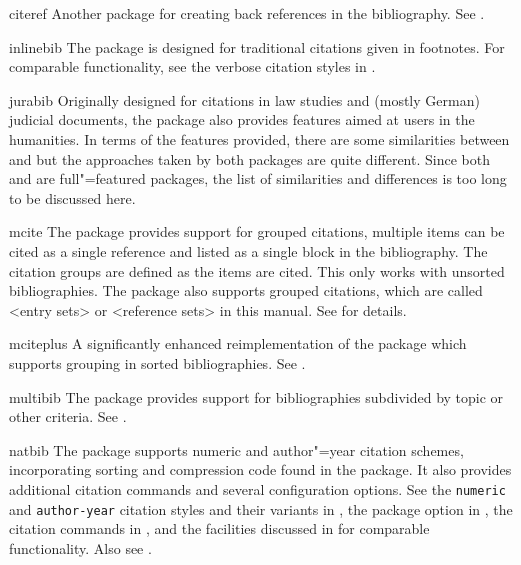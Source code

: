 \documentclass{ltxdockit}[2011/03/25]
\newcommand*{\biblatex}{\sty{biblatex}\xspace}
\begin{document}
\begin{marglist}
\item[citeref]
Another package for creating back references in the bibliography. See .

\item[inlinebib]
The  package is designed for traditional citations given in footnotes. For comparable functionality, see the verbose citation styles in .

\item[jurabib]
Originally designed for citations in law studies and (mostly German) judicial documents, the  package also provides features aimed at users in the humanities. In terms of the features provided, there are some similarities between  and \biblatex but the approaches taken by both packages are quite different. Since both  and \biblatex are full"=featured packages, the list of similarities and differences is too long to be discussed here.

\item[mcite]
The  package provides support for grouped citations, \ie multiple items can be cited as a single reference and listed as a single block in the bibliography. The citation groups are defined as the items are cited. This only works with unsorted bibliographies. The \biblatex package also supports grouped citations, which are called <entry sets> or <reference sets> in this manual. See  for details.

\item[mciteplus]
A significantly enhanced reimplementation of the  package which supports grouping in sorted bibliographies. See .

\item[multibib]
The  package provides support for bibliographies subdivided by topic or other criteria. See .

\item[natbib]
The  package supports numeric and author"=year citation schemes, incorporating sorting and compression code found in the  package. It also provides additional citation commands and several configuration options. See the \texttt{numeric} and \texttt{author-year} citation styles and their variants in , the  package option in , the citation commands in , and the facilities discussed in  for comparable functionality. Also see .


\end{marglist}
\end{document}
